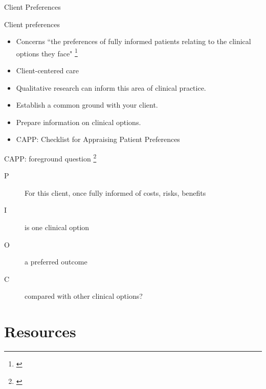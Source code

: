 \documentclass{beamer}
\begin{document}
% 
\begin{frame}
	\begin{center}
	\huge{Client Preferences}
	\end{center}
\end{frame}

% 
\begin{frame}{Client preferences}
	\begin{itemize}
	\item Concerns ``the preferences of fully informed patients relating to the clinical options they face" \footnote{\tiny{\citet[p. 123]{Dollaghan2007a}}}
	\item Client-centered care
	\item Qualitative research can inform this area of clinical practice.
	\item Establish a common ground with your client.
	\item Prepare information on clinical options.
	\item CAPP: Checklist for Appraising Patient Preferences
	\end{itemize}
\end{frame}

% 
\begin{frame}{CAPP: foreground question \footnote{\tiny{\citet[p. 128]{Dollaghan2007a}}}}
	\begin{description}
	\item[P] For \alert{this client, once fully informed of costs, risks, benefits}
	\item[I] is \alert{one clinical option}
	\item[O] a preferred \alert{outcome}
	\item[C] compared with \alert{other clinical options}?
	\end{description} 
\end{frame}

\section{Resources}
\end{document}

